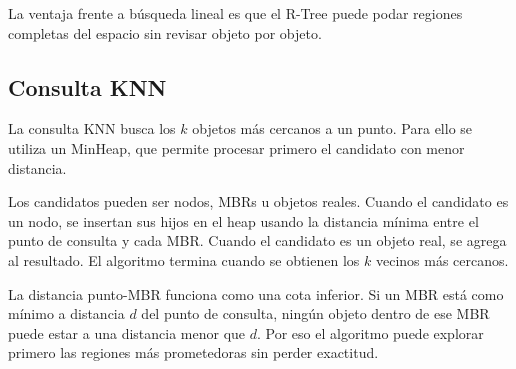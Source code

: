 \documentclass[11pt,a4paper]{article}
\begin{document}
La ventaja frente a búsqueda lineal es que el R-Tree puede podar regiones completas del espacio sin revisar objeto por objeto.

\subsection{Consulta KNN}

La consulta KNN busca los $k$ objetos más cercanos a un punto. Para ello se utiliza un MinHeap, que permite procesar primero el candidato con menor distancia.

Los candidatos pueden ser nodos, MBRs u objetos reales. Cuando el candidato es un nodo, se insertan sus hijos en el heap usando la distancia mínima entre el punto de consulta y cada MBR. Cuando el candidato es un objeto real, se agrega al resultado. El algoritmo termina cuando se obtienen los $k$ vecinos más cercanos.

La distancia punto-MBR funciona como una cota inferior. Si un MBR está como mínimo a distancia $d$ del punto de consulta, ningún objeto dentro de ese MBR puede estar a una distancia menor que $d$. Por eso el algoritmo puede explorar primero las regiones más prometedoras sin perder exactitud.
\end{document}
